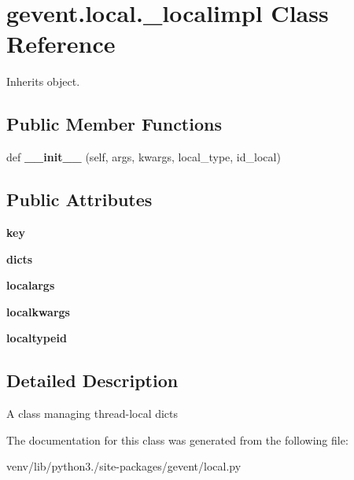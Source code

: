 \hypertarget{classgevent_1_1local_1_1__localimpl}{}\section{gevent.\+local.\+\_\+localimpl Class Reference}
\label{classgevent_1_1local_1_1__localimpl}


Inherits object.

\subsection*{Public Member Functions}
\begin{DoxyCompactItemize}
\item 
\mbox{\label{classgevent_1_1local_1_1__localimpl_aa28d0ada4841463c364a5939b60313e6}} 
def {\bfseries \+\_\+\+\_\+init\+\_\+\+\_\+} (self, args, kwargs, local\+\_\+type, id\+\_\+local)
\end{DoxyCompactItemize}
\subsection*{Public Attributes}
\begin{DoxyCompactItemize}
\item 
\mbox{\label{classgevent_1_1local_1_1__localimpl_a525f3bb01245446df1a4f36139948159}} 
{\bfseries key}
\item 
\mbox{\label{classgevent_1_1local_1_1__localimpl_a4ce0de9dea950d0354cf05b7e3a7e774}} 
{\bfseries dicts}
\item 
\mbox{\label{classgevent_1_1local_1_1__localimpl_a720692419a72ccb11e788b04566c0db7}} 
{\bfseries localargs}
\item 
\mbox{\label{classgevent_1_1local_1_1__localimpl_a6ff9ef0a6238b22d74b6086b1a0677f9}} 
{\bfseries localkwargs}
\item 
\mbox{\label{classgevent_1_1local_1_1__localimpl_a3129c99181ed801cf09f908d2bba2bbc}} 
{\bfseries localtypeid}
\end{DoxyCompactItemize}


\subsection{Detailed Description}
\begin{DoxyVerb}A class managing thread-local dicts\end{DoxyVerb}
 

The documentation for this class was generated from the following file\+:\begin{DoxyCompactItemize}
\item 
venv/lib/python3./site-\/packages/gevent/local.\+py\end{DoxyCompactItemize}
